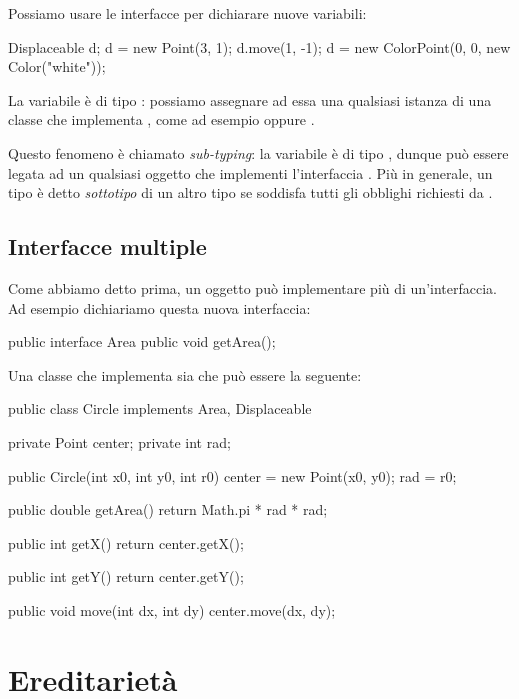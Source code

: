 Possiamo usare le interfacce per dichiarare nuove variabili:
\begin{Java}
    Displaceable d;
    d = new Point(3, 1);
    d.move(1, -1);
    d = new ColorPoint(0, 0, new Color("white"));
\end{Java}

La variabile  è di tipo : possiamo assegnare ad essa una qualsiasi istanza di una classe che implementa , come ad esempio  oppure .

Questo fenomeno è chiamato \emph{sub-typing}: la variabile  è di tipo , dunque può essere legata ad un qualsiasi oggetto che implementi l'interfaccia . Più in generale, un tipo  è detto \emph{sottotipo} di un altro tipo  se  soddisfa tutti gli obblighi richiesti da .

\subsection{Interfacce multiple}

Come abbiamo detto prima, un oggetto può implementare più di un'interfaccia. Ad esempio dichiariamo questa nuova interfaccia:
\begin{Java}
    public interface Area{
        public void getArea();
    }
\end{Java}

Una classe che implementa sia  che  può essere la seguente:
\begin{Java}
    public class Circle implements Area, Displaceable{
        private Point center;
        private int rad;

        public Circle(int x0, int y0, int r0){
            center = new Point(x0, y0);
            rad = r0;
        }

        public double getArea(){
            return Math.pi * rad * rad;
        }

        public int getX(){
            return center.getX();
        }

        public int getY(){
            return center.getY();
        }

        public void move(int dx, int dy){
            center.move(dx, dy);
        }
    }
\end{Java}

\section{Ereditarietà}

